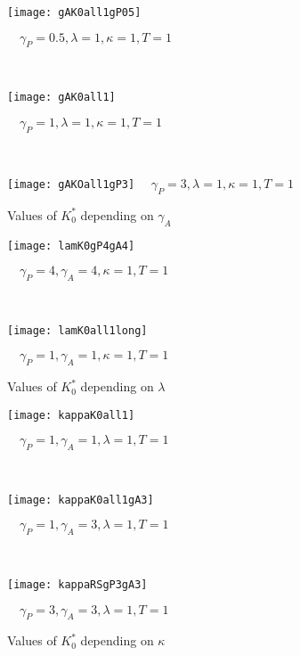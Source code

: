 \documentclass[numbook, envcountsect, envcountsame, envcountreset, runningheads, smallextended]{article}
\begin{document}
\begin{figure}[htp]
\caption{Values of $K_0^*$ depending on $\gamma_A$}
\label{KO2}
\centering
\begin{minipage}{0.31\textwidth}
  \centering
  \texttt{[image: gAK0all1gP05]}
   \par
  \footnotesize{$\quad \gamma_P=0.5, \lambda = 1, \kappa=1, T=1$}
\end{minipage}
~
~
\begin{minipage}{0.31\textwidth}
  \centering
  \texttt{[image: gAK0all1]} \par
  \footnotesize{$\quad \gamma_P=1, \lambda = 1, \kappa=1, T=1$}
  \label{fig:test1}
\end{minipage}%
~
~
\begin{minipage}{0.31\textwidth}
  \centering
  \texttt{[image: gAKOall1gP3]}
  \footnotesize{$\quad \gamma_P=3, \lambda = 1, \kappa=1, T=1$}
\end{minipage}
\end{figure}


\begin{figure}[htp]
\caption{Values of $K_0^*$ depending on $\lambda$}
\label{KO3}
\centering
\begin{minipage}{0.31\textwidth}
  \centering
  \texttt{[image: lamK0gP4gA4]} \par
  \footnotesize{$\quad \gamma_P=4, \gamma_A = 4, \kappa=1, T=1$}
  \label{fig:test1}
\end{minipage}%
~
~
\begin{minipage}{0.31\textwidth}
  \centering
  \texttt{[image: lamK0all1long]}
   \par
  \footnotesize{$\quad \gamma_P=1, \gamma_A = 1, \kappa=1, T=1$}
\end{minipage}

\end{figure}

\begin{figure}[htp]
\caption{Values of $K_0^*$ depending on $\kappa$}
\label{KO4}
\centering
\begin{minipage}{0.31\textwidth}
  \centering
  \texttt{[image: kappaK0all1]} \par
  \footnotesize{$\quad \gamma_P=1, \gamma_A = 1, \lambda=1, T=1$}
  \label{fig:test1}
\end{minipage}%
~
~
\begin{minipage}{0.31\textwidth}
  \centering
  \texttt{[image: kappaK0all1gA3]}
   \par
  \footnotesize{$\quad \gamma_P=1, \gamma_A = 3, \lambda=1, T=1$}
\end{minipage}
~
~
\begin{minipage}{0.31\textwidth}
  \centering
  \texttt{[image: kappaRSgP3gA3]}
   \par
  \footnotesize{$\quad \gamma_P=3, \gamma_A = 3, \lambda=1, T=1$}
\end{minipage}

\end{figure}
\end{document}

